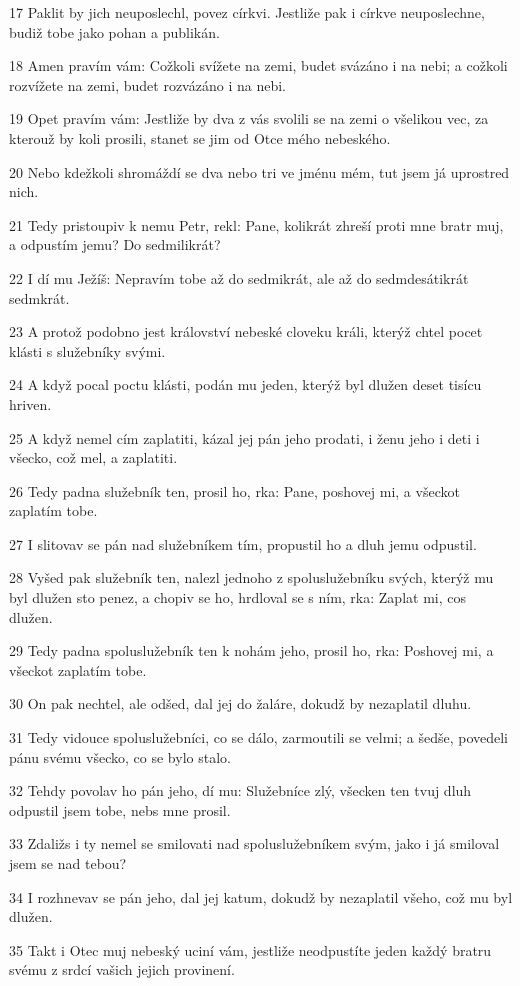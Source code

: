 \par 17 Paklit by jich neuposlechl, povez církvi. Jestliže pak i církve neuposlechne, budiž tobe jako pohan a publikán.
\par 18 Amen pravím vám: Cožkoli svížete na zemi, budet svázáno i na nebi; a cožkoli rozvížete na zemi, budet rozvázáno i na nebi.
\par 19 Opet pravím vám: Jestliže by dva z vás svolili se na zemi o všelikou vec, za kterouž by koli prosili, stanet se jim od Otce mého nebeského.
\par 20 Nebo kdežkoli shromáždí se dva nebo tri ve jménu mém, tut jsem já uprostred nich.
\par 21 Tedy pristoupiv k nemu Petr, rekl: Pane, kolikrát zhreší proti mne bratr muj, a odpustím jemu? Do sedmilikrát?
\par 22 I dí mu Ježíš: Nepravím tobe až do sedmikrát, ale až do sedmdesátikrát sedmkrát.
\par 23 A protož podobno jest království nebeské cloveku králi, kterýž chtel pocet klásti s služebníky svými.
\par 24 A když pocal poctu klásti, podán mu jeden, kterýž byl dlužen deset tisícu hriven.
\par 25 A když nemel cím zaplatiti, kázal jej pán jeho prodati, i ženu jeho i deti i všecko, což mel, a zaplatiti.
\par 26 Tedy padna služebník ten, prosil ho, rka: Pane, poshovej mi, a všeckot zaplatím tobe.
\par 27 I slitovav se pán nad služebníkem tím, propustil ho a dluh jemu odpustil.
\par 28 Vyšed pak služebník ten, nalezl jednoho z spoluslužebníku svých, kterýž mu byl dlužen sto penez, a chopiv se ho, hrdloval se s ním, rka: Zaplat mi, cos dlužen.
\par 29 Tedy padna spoluslužebník ten k nohám jeho, prosil ho, rka: Poshovej mi, a všeckot zaplatím tobe.
\par 30 On pak nechtel, ale odšed, dal jej do žaláre, dokudž by nezaplatil dluhu.
\par 31 Tedy vidouce spoluslužebníci, co se dálo, zarmoutili se velmi; a šedše, povedeli pánu svému všecko, co se bylo stalo.
\par 32 Tehdy povolav ho pán jeho, dí mu: Služebníce zlý, všecken ten tvuj dluh odpustil jsem tobe, nebs mne prosil.
\par 33 Zdaližs i ty nemel se smilovati nad spoluslužebníkem svým, jako i já smiloval jsem se nad tebou?
\par 34 I rozhnevav se pán jeho, dal jej katum, dokudž by nezaplatil všeho, což mu byl dlužen.
\par 35 Takt i Otec muj nebeský uciní vám, jestliže neodpustíte jeden každý bratru svému z srdcí vašich jejich provinení.

